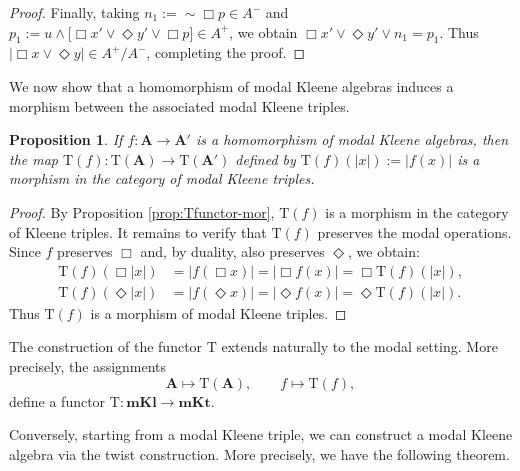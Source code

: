 \documentclass{article}
\newtheorem{proposition}[theorem]{Proposition}
\newcommand{\A}{\mathbf{A}}
\begin{document}
\begin{proof}
    Finally, taking $n_1 := \sim \Box p \in A^{-}$ and $p_1 := u \wedge \bigl[\Box x' \vee \Diamond y' \vee \Box p\bigr] \in A^{+}$, we obtain $\Box x' \vee \Diamond y' \vee n_1 = p_1$. Thus $|\Box x \vee \Diamond y| \in A^{+}/A^{-}$, completing the proof.
\end{proof}

We now show that a homomorphism of modal Kleene algebras induces a morphism between the associated modal Kleene triples.

\begin{proposition}\label{moorfismos mkl}
    If $f : \A \rightarrow \A'$ is a homomorphism of modal Kleene algebras, then the map $\mathrm{T}(f) :\mathrm{T}(\A) \rightarrow \mathrm{T}(\A')$ defined by $\mathrm{T}(f)(|x|) := |f(x)|$ is a morphism in the category of modal Kleene triples.
\end{proposition}
\begin{proof}
    By Proposition \ref{prop:Tfunctor-mor}, $\mathrm{T}(f)$ is a morphism in the category of Kleene triples. It remains to verify that $\mathrm{T}(f)$ preserves the modal operations. Since $f$ preserves $\Box$ and, by duality, also preserves $\Diamond$, we obtain:
    \begin{align*}
        \mathrm{T}(f)(\Box|x|) &= |f(\Box x)| = |\Box f(x)| = \Box \mathrm{T}(f)(|x|),\\
        \mathrm{T}(f)(\Diamond|x|) &= |f(\Diamond x)| = |\Diamond f(x)| = \Diamond \mathrm{T}(f)(|x|).
    \end{align*}
    Thus $\mathrm{T}(f)$ is a morphism of modal Kleene triples.
\end{proof}

The construction of the functor $\mathrm{T}$ extends naturally to the modal setting. More precisely, the assignments
\[
\A\mapsto\mathrm{T}(\A),\qquad
f\mapsto\mathrm{T}(f),
\]
define a functor $\mathrm{T}:\mathbf{mKl}\longrightarrow\mathbf{mKt}$.

Conversely, starting from a modal Kleene triple, we can construct a modal Kleene algebra via the twist construction. More precisely, we have the following theorem.
\end{document}
